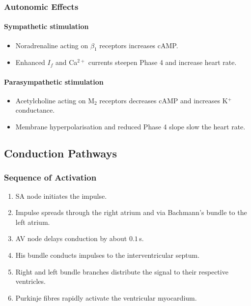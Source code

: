 \documentclass[11pt,a4paper]{article}
\begin{document}
\subsubsection{Autonomic Effects}

\paragraph{Sympathetic stimulation}
\begin{itemize}
  \item Noradrenaline acting on $\beta_1$ receptors increases cAMP.
  \item Enhanced $I_f$ and Ca$^{2+}$ currents steepen Phase 4 and increase heart rate.
\end{itemize}

\paragraph{Parasympathetic stimulation}
\begin{itemize}
  \item Acetylcholine acting on M$_2$ receptors decreases cAMP and increases K$^+$ conductance.
  \item Membrane hyperpolarisation and reduced Phase 4 slope slow the heart rate.
\end{itemize}

\subsection{Conduction Pathways}

\subsubsection{Sequence of Activation}

\begin{enumerate}
  \item SA node initiates the impulse.
  \item Impulse spreads through the right atrium and via Bachmann's bundle to the left atrium.
  \item AV node delays conduction by about $0.1$\,s.
  \item His bundle conducts impulses to the interventricular septum.
  \item Right and left bundle branches distribute the signal to their respective ventricles.
  \item Purkinje fibres rapidly activate the ventricular myocardium.
\end{enumerate}
\end{document}
